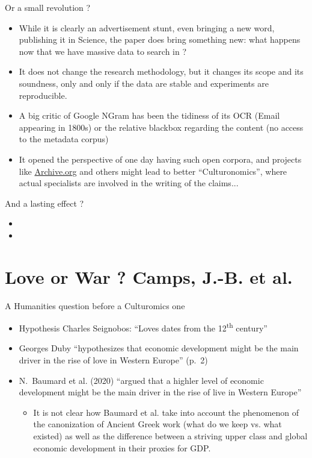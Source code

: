 \documentclass[aspectratio=169]{beamer}
\begin{document}
\begin{frame}{Or a small revolution ?}
    \begin{itemize}
        \item While it is clearly an advertisement stunt, even bringing a new word, publishing it in Science, the paper does bring something new: what happens now that we have massive data to search in ?
        \item It does not change the research methodology, but it changes its scope and its soundness, only and only if the data are stable and experiments are reproducible.
        \item A big critic of Google NGram has been the tidiness of its OCR (Email appearing in 1800s) or the relative blackbox regarding the content (no access to the metadata corpus)
        \item It opened the perspective of one day having such open corpora, and projects like \url{Archive.org} and others might lead to better ``Culturonomics'', where actual specialists are involved in the writing of the claims...
    \end{itemize}
\end{frame}

\begin{frame}{And a lasting effect ?}

\begin{itemize}
    \item {}
    \item {}
\end{itemize}
    
\end{frame}

\section{Love or War ? Camps, J.-B. et al.}

\begin{frame}{A Humanities question before a Culturomics one}
    \begin{itemize}
        \item Hypothesis Charles Seignobos: ``Loves dates from the 12\textsuperscript{th} century''
        \item Georges Duby ``hypothesizes that economic development might be the main driver in the rise of love in Western Europe'' (p.~2)
        \item N.~Baumard et al. (2020) ``argued that a highler level of economic development might be the main driver in the rise of live in Western Europe''
        \begin{itemize}
            \item It is not clear how Baumard et al. take into account the phenomenon of the canonization of Ancient Greek work (what do we keep vs. what existed) as well as the difference between a striving upper class and global economic development in their proxies for GDP.
        \end{itemize}
    \end{itemize}
\end{frame}
\end{document}
